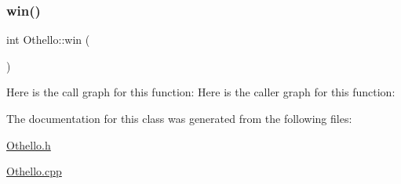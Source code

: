 \subsubsection{\texorpdfstring{win()}{win()}}
{\footnotesize\ttfamily int Othello\+::win (\begin{DoxyParamCaption}{ }\end{DoxyParamCaption})}

Here is the call graph for this function\+:
Here is the caller graph for this function\+:


The documentation for this class was generated from the following files\+:\begin{DoxyCompactItemize}
\item 
\hyperlink{_othello_8h}{Othello.\+h}\item 
\hyperlink{_othello_8cpp}{Othello.\+cpp}\end{DoxyCompactItemize}

